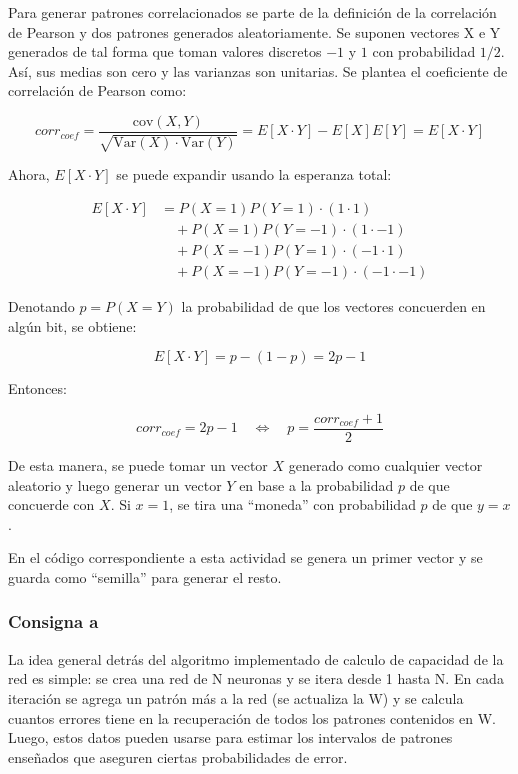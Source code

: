 \documentclass[11pt]{article} %
\begin{document}
Para generar patrones correlacionados se parte de la definición de la correlación de Pearson y dos patrones generados aleatoriamente. Se suponen vectores X e Y generados de tal forma que toman valores discretos $-1$ y $1$ con probabilidad $1/2$. Así, sus medias son cero y las varianzas son unitarias. Se plantea el coeficiente de correlación de Pearson como:

\begin{equation}
corr_{coef} = \frac{\mathrm{cov}(X,Y)}{\sqrt{\mathrm{Var}(X)\cdot \mathrm{Var}(Y)}} =  E[X \cdot Y] - E[X]E[Y] = E[X \cdot Y]
\end{equation}

Ahora, $E[X \cdot Y]$ se puede expandir usando la esperanza total:

\begin{align*}
E[X \cdot Y] &= P(X=1)P(Y=1)\cdot (1\cdot 1) \\
&\quad + P(X=1)P(Y=-1)\cdot (1\cdot -1) \\
&\quad + P(X=-1)P(Y=1)\cdot (-1\cdot 1) \\
&\quad + P(X=-1)P(Y=-1)\cdot (-1\cdot -1)
\end{align*}

Denotando $p = P(X=Y)$ la probabilidad de que los vectores concuerden en algún bit, se obtiene:

\begin{equation}
E[X \cdot Y] = p - (1-p) = 2p-1
\end{equation}

Entonces:

\begin{equation}
corr_{coef} = 2p-1 \quad \Leftrightarrow \quad p = \frac{corr_{coef} +1}{2}
\end{equation}

De esta manera, se puede tomar un vector $X$ generado como cualquier vector aleatorio y luego generar un vector $Y$ en base a la probabilidad $p$ de que concuerde con $X$. Si $x=1$, se tira una ``moneda'' con probabilidad $p$ de que $y=x$.

En el código correspondiente a esta actividad se genera un primer vector y se guarda como ``semilla'' para generar el resto. 

\newpage
\subsubsection{Consigna a}

La idea general detrás del algoritmo implementado de calculo de capacidad de la red es simple: se crea una red de N neuronas y se itera desde 1 hasta N. En cada iteración se agrega un patrón más a la red (se actualiza la W) y se calcula cuantos errores tiene en la recuperación de todos los patrones contenidos en W. Luego, estos datos pueden usarse para estimar los intervalos de patrones enseñados que aseguren ciertas probabilidades de error. 
\end{document}
